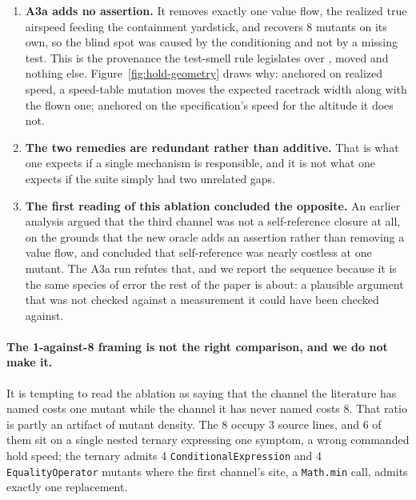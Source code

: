 \documentclass[12pt]{article}
\begin{document}
\begin{enumerate}
\item \textbf{A3a adds no assertion.} It removes exactly one value flow, the
realized true airspeed feeding the containment yardstick, and recovers 8 mutants
on its own, so the blind spot was caused by the conditioning and not by a missing
test. This is the provenance the test-smell rule legislates over
\cite{rwemalika2021}, moved and nothing else. Figure~\ref{fig:hold-geometry} draws why: anchored on realized speed, a
speed-table mutation moves the expected racetrack width along with the flown one;
anchored on the specification's speed for the altitude it does not.

\item \textbf{The two remedies are redundant rather than additive.} That is what
one expects if a single mechanism is responsible, and it is not what one expects if
the suite simply had two unrelated gaps.

\item \textbf{The first reading of this ablation concluded the opposite.} An
earlier analysis argued that the third channel was not a self-reference closure
at all, on the grounds that the new oracle adds an assertion rather than removing
a value flow, and concluded that self-reference was nearly costless at one
mutant. The A3a run refutes that, and we report the sequence because it is the
same species of error the rest of the paper is about: a plausible argument that
was not checked against a measurement it could have been checked against.
\end{enumerate}

\paragraph{The 1-against-8 framing is not the right comparison, and we do not make it.}
It is tempting to read the ablation as saying that the channel the literature has
named costs one mutant while the channel it has never named costs 8. That
ratio is partly an artifact of mutant density. The 8 occupy 3 source
lines, and 6 of them sit on a single nested ternary expressing one symptom, a
wrong commanded hold speed; the ternary admits 4 \texttt{ConditionalExpression}
and 4 \texttt{EqualityOperator} mutants where the first channel's site, a
\texttt{Math.min} call, admits exactly one replacement.
\end{document}
